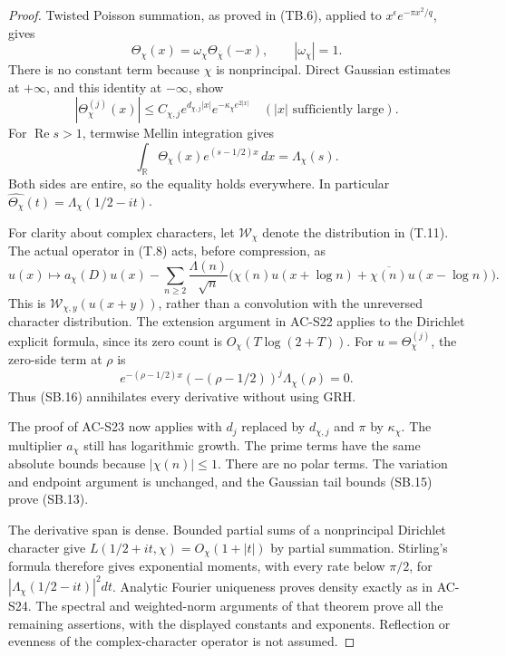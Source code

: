 \begin{proof}
Twisted Poisson summation, as proved in (TB.6), applied to
\(x^\epsilon e^{-\pi x^2/q}\), gives
\[
 \Theta_\chi(x)=\omega_\chi\Theta_{\overline\chi}(-x),
 \qquad|\omega_\chi|=1 .
\]
There is no constant term because \(\chi\) is nonprincipal.
Direct Gaussian estimates at \(+\infty\), and this identity at
\(-\infty\), show
\[
 |\Theta_\chi^{(j)}(x)|
 \leq C_{\chi,j}e^{d_{\chi,j}|x|}
                        e^{-\kappa_\chi e^{2|x|}}
 \quad(|x|\text{ sufficiently large}).
                                                               \tag{SB.15}
\]
For \(\operatorname{Re}s>1\), termwise Mellin integration gives
\[
 \int_{\mathbb R}\Theta_\chi(x)e^{(s-1/2)x}\,dx
       =\Lambda_\chi(s).
\]
Both sides are entire, so the equality holds everywhere.
In particular
\(\widehat{\Theta_\chi}(t)=\Lambda_\chi(1/2-it)\).

For clarity about complex characters, let
\(\mathcal W_\chi\) denote the distribution in (T.11).
The actual operator in (T.8) acts, before compression, as
\[
 u(x)\longmapsto
 a_\chi(D)u(x)-
 \sum_{n\geq2}\frac{\Lambda(n)}{\sqrt n}
 \bigl(\chi(n)u(x+\log n)+
             \overline{\chi(n)}u(x-\log n)\bigr).
                                                               \tag{SB.16}
\]
This is \(\mathcal W_{\chi,y}(u(x+y))\), rather than a
convolution with the unreversed character distribution.
The extension argument in AC-S22 applies to the Dirichlet
explicit formula, since its zero count is
\(O_\chi(T\log(2+T))\).
For \(u=\Theta_\chi^{(j)}\), the zero-side term at \(\rho\) is
\[
 e^{-(\rho-1/2)x}(-(\rho-1/2))^j\Lambda_\chi(\rho)=0 .
\]
Thus (SB.16) annihilates every derivative without using GRH.

The proof of AC-S23 now applies with \(d_j\) replaced by
\(d_{\chi,j}\) and \(\pi\) by \(\kappa_\chi\).
The multiplier \(a_\chi\) still has logarithmic growth.
The prime terms have the same absolute bounds because
\(|\chi(n)|\leq1\).  There are no polar terms.
The variation and endpoint argument is unchanged, and the
Gaussian tail bounds (SB.15) prove (SB.13).

The derivative span is dense.  Bounded partial sums of a
nonprincipal Dirichlet character give
\(L(1/2+it,\chi)=O_\chi(1+|t|)\) by partial summation.
Stirling's formula therefore gives exponential moments, with
every rate below \(\pi/2\), for
\(|\Lambda_\chi(1/2-it)|^2dt\).
Analytic Fourier uniqueness proves density exactly as in AC-S24.
The spectral and weighted-norm arguments of that theorem prove
all the remaining assertions, with the displayed constants and
exponents.  Reflection or evenness of the complex-character
operator is not assumed.
\end{proof}

